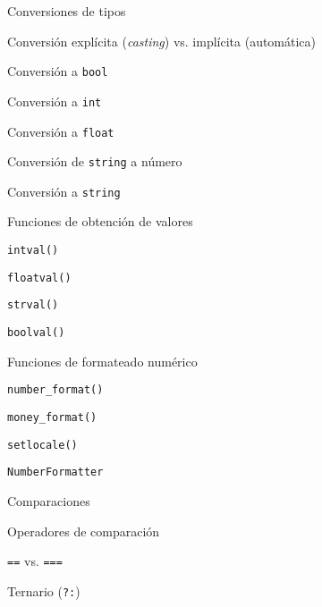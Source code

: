 \begin{longenum}
\begin{longenum}
\begin{longenum}
\begin{longenum}
            \end{longenum}
            \item Conversiones de tipos
            \begin{longenum}
                \item Conversión explícita (\textit{casting}) vs. implícita (automática)
                \item Conversión a \texttt{bool}
                \item Conversión a \texttt{int}
                \item Conversión a \texttt{float}
                \item Conversión de \texttt{string} a número
                \item Conversión a \texttt{string}
                \item Funciones de obtención de valores
                \begin{longenum}
                    \item \texttt{intval()}
                    \item \texttt{floatval()}
                    \item \texttt{strval()}
                    \item \texttt{boolval()}
                \end{longenum}
                \item Funciones de formateado numérico
                \begin{longenum}
                    \item \texttt{number\_format()}
                    \item \texttt{money\_format()}
                    \begin{longenum}
                        \item \texttt{setlocale()}
                    \end{longenum}
                    \item \texttt{NumberFormatter}
                \end{longenum}
            \end{longenum}
            \item Comparaciones
            \begin{longenum}
                \item Operadores de comparación
                \item \texttt{==} vs. \texttt{===}
                \item Ternario (\texttt{?:})

\end{longenum}
\end{longenum}
\end{longenum}
\end{longenum}
